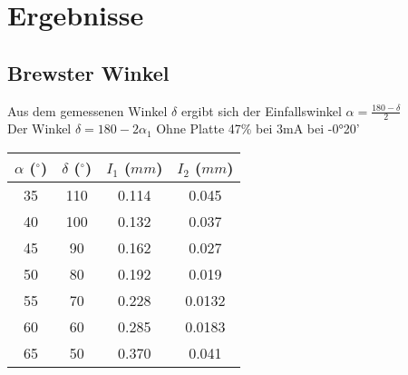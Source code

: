 \documentclass{article}
\begin{document}
\section{Ergebnisse}
\subsection{Brewster Winkel}
Aus dem gemessenen Winkel $\delta$ ergibt sich der Einfallswinkel $\alpha=\frac{180-\delta}{2}$\\
Der Winkel $\delta=180-2\alpha_1$
Ohne Platte 47\% bei 3mA bei -0°20'

\begin{table}[H]
\begin{center}
\begin{tabular}{|c|c|c|c|}
\hline
$\alpha$ ($^\circ$) & $\delta$ ($^\circ$) & $I_1$ ($mm$) & $I_2$ ($mm$)\\
\hline
35 & 110 & 0.114 & 0.045\\
40 & 100 & 0.132 & 0.037\\
45 & 90 & 0.162 & 0.027\\
50 & 80 & 0.192 & 0.019\\
55 & 70 & 0.228 & 0.0132\\
60 & 60 & 0.285 & 0.0183\\
65 & 50 & 0.370 & 0.041\\
\hline
\end{tabular}
\end{center}
\end{table}

\end{document}
